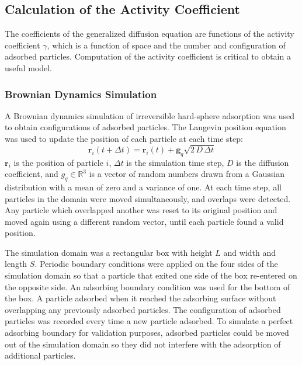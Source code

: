 \subsection{Calculation of the Activity Coefficient}

The coefficients of the generalized diffusion equation are functions
of the activity coefficient $\gamma$, which is a function of space
and the number and configuration of adsorbed particles. Computation
of the activity coefficient is critical to obtain a useful model. 


\subsubsection{Brownian Dynamics Simulation}

A Brownian dynamics simulation of irreversible hard-sphere adsorption
was used to obtain configurations of adsorbed particles. The Langevin
position equation \cite{Elimelech1998} was used to update the position
of each particle at each time step: \begin{equation}
\mathbf{r}_{i}(t+\Delta t)=\mathbf{r}_{i}(t)+\mathbf{g}_{q}\sqrt{2\, D\,\Delta t}\label{eq:Langevin equation}\end{equation}
$\mathbf{r}_{i}$ is the position of particle $i$, $\Delta t$ is
the simulation time step, $D$ is the diffusion coefficient, and $g_{q}\in\mathbb{R}^{3}$
is a vector of random numbers drawn from a Gaussian distribution with
a mean of zero and a variance of one. At each time step, all particles
in the domain were moved simultaneously, and overlaps were detected.
Any particle which overlapped another was reset to its original position
and moved again using a different random vector, until each particle
found a valid position. 

The simulation domain was a rectangular box with height $L$ and width
and length $S$. Periodic boundary conditions were applied on the
four sides of the simulation domain so that a particle that exited
one side of the box re-entered on the opposite side. An adsorbing
boundary condition was used for the bottom of the box. A particle
adsorbed when it reached the adsorbing surface without overlapping
any previously adsorbed particles. The configuration of adsorbed particles
was recorded every time a new particle adsorbed. To simulate a perfect
adsorbing boundary for validation purposes, adsorbed particles could
be moved out of the simulation domain so they did not interfere with
the adsorption of additional particles. 

